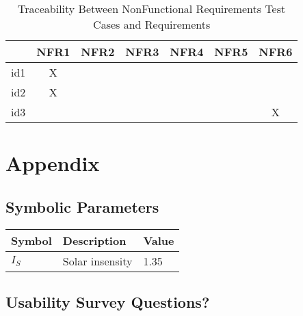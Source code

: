 \documentclass[12pt, titlepage]{article}
\begin{document}
\begin{table}[h!]
\centering
\begin{tabular}{|c|c|c|c|c|c|c|}
\hline        
	& NFR1& NFR2 & NFR3 &NFR4 & NFR5 &NFR6 \\
\hline
id1        & X &    &     &    &    &     \\ \hline
id2        & X &    &     &    &    &     \\ \hline
id3        &    &    &     &    &    & X  \\ \hline


\hline
\end{tabular}
\caption{Traceability Between NonFunctional Requirements Test Cases and
Requirements}
\label{Table:trace}
\end{table}




\newpage


 
%


\newpage

\section{Appendix}


\subsection{Symbolic Parameters}

  \noindent \begin{tabular}{l l l} 
    \toprule		
    \textbf{Symbol} & \textbf{Description} & \textbf{Value}\\
    \midrule 
    $I_{S}$ & Solar insensity &1.35  \\
    \bottomrule
  \end{tabular}


 \subsection{Usability Survey Questions?}
\end{document}
